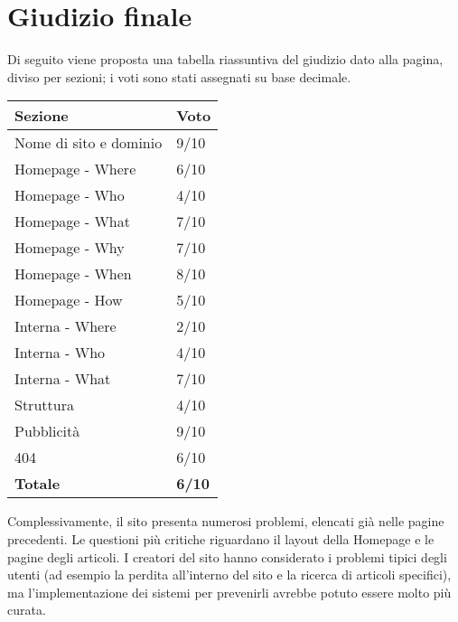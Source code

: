 \newpage
\section{Giudizio finale}

Di seguito viene proposta una tabella riassuntiva del giudizio dato alla pagina, diviso per sezioni; i voti sono stati assegnati su base decimale.

\vspace{30pt}
\begin{table}[htbp]
\centering
\begin{tabular}{|l|l|}
\hline
Sezione                & Voto \\ \hline
Nome di sito e dominio & 9/10    \\
Homepage - Where       & 6/10    \\
Homepage - Who         & 4/10    \\
Homepage - What        & 7/10    \\
Homepage - Why         & 7/10    \\
Homepage - When        & 8/10    \\
Homepage - How         & 5/10    \\
Interna - Where        & 2/10    \\
Interna - Who          & 4/10    \\
Interna - What         & 7/10    \\
Struttura              & 4/10    \\
Pubblicità             & 9/10    \\
404                    & 6/10    \\ \hline
\textbf{Totale}        & \textbf{6/10}    \\ \hline
\end{tabular}
\end{table}
\vspace{30pt}

Complessivamente, il sito presenta numerosi problemi, elencati già nelle pagine precedenti. Le questioni più critiche riguardano il layout della Homepage e le pagine degli articoli. I creatori del sito hanno considerato i problemi tipici degli utenti (ad esempio la perdita all'interno del sito e la ricerca di articoli specifici), ma l'implementazione dei sistemi per prevenirli avrebbe potuto essere molto più curata. \\